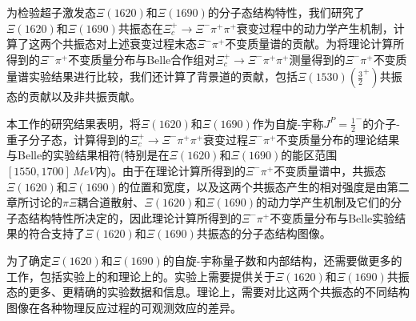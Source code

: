 为检验超子激发态$\Xi(1620)$和$\Xi(1690)$的分子态结构特性，我们研究了$\Xi(1620)$和$\Xi(1690)$共振态在$\Xi_{c}^{+}\to\Xi^{-}\pi^{+}\pi^{+}$衰变过程中的动力学产生机制，计算了这两个共振态对上述衰变过程末态$\Xi^{-}\pi^{+}$不变质量谱的贡献。为将理论计算所得到的$\Xi^{-}\pi^{+}$不变质量分布与Belle合作组对$\Xi_{c}^{+}\to\Xi^{-}\pi^{+}\pi^{+}$测量得到的$\Xi^{-}\pi^{+}$不变质量谱实验结果进行比较，我们还计算了背景道的贡献，包括$\Xi(1530)(\frac{3}{2}^{+})$共振态的贡献以及非共振贡献。\par
本工作的研究结果表明，将$\Xi(1620)$和$\Xi(1690)$作为自旋-宇称$J^{P}=\frac{1}{2}^{-}$的介子-重子分子态，计算得到的$\Xi_{c}^{+}\to\Xi^{-}\pi^{+}\pi^{+}$衰变过程$\Xi^{-}\pi^{+}$不变质量分布的理论结果与Belle的实验结果相符(特别是在$\Xi(1620)$和$\Xi(1690)$的能区范围$[1550,1700]\,\si{MeV}$内)。由于在理论计算所得到的$\Xi^{-}\pi^{+}$不变质量谱中，共振态$\Xi(1620)$和$\Xi(1690)$的位置和宽度，以及这两个共振态产生的相对强度是由第二章所讨论的$\pi\Xi$耦合道散射、$\Xi(1620)$和$\Xi(1690)$的动力学产生机制及它们的分子态结构特性所决定的，因此理论计算所得到的$\Xi^{-}\pi^{+}$不变质量分布与Belle实验结果的符合支持了$\Xi(1620)$和$\Xi(1690)$共振态的分子态结构图像。\par
为了确定$\Xi(1620)$和$\Xi(1690)$的自旋-宇称量子数和内部结构，还需要做更多的工作，包括实验上的和理论上的。实验上需要提供关于$\Xi(1620)$和$\Xi(1690)$共振态的更多、更精确的实验数据和信息。理论上，需要对比这两个共振态的不同结构图像在各种物理反应过程的可观测效应的差异。
